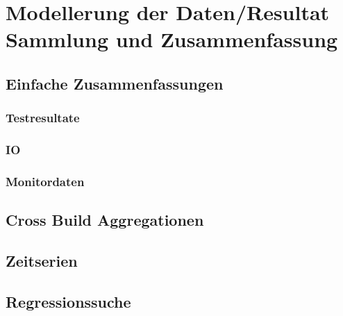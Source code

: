 \chapter{Modellerung der Daten/Resultat Sammlung und Zusammenfassung}
\section{Einfache Zusammenfassungen}
\subsection{Testresultate}
\subsection{IO}
\subsection{Monitordaten}
\section{Cross Build Aggregationen}
\section{Zeitserien}
\section{Regressionssuche}


